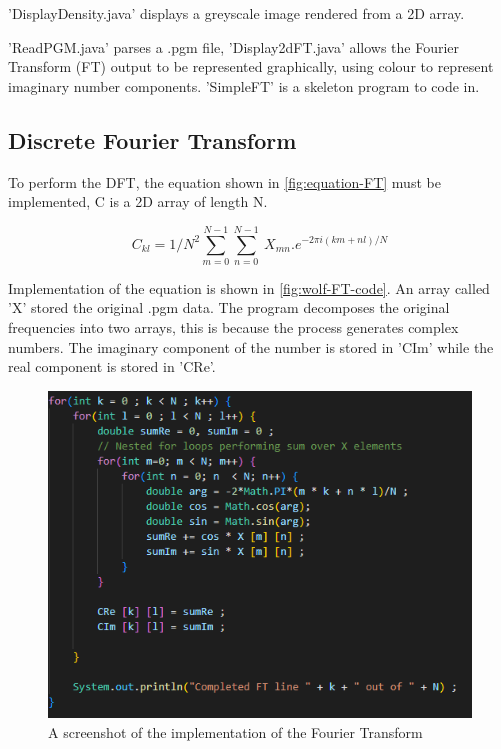     'DisplayDensity.java' displays a greyscale image rendered from a 2D array.
    
    'ReadPGM.java' parses a .pgm file, 'Display2dFT.java' allows the Fourier Transform (FT) output to be represented graphically, using colour to represent imaginary number components. 'SimpleFT' is a skeleton program to code in.
    

    
    \subsection{Discrete Fourier Transform}
    To perform the DFT, the equation shown in \autoref{fig:equation-FT} must be implemented, C is a 2D array of length N.
    
    \begin{center}
        \begin{equation}
            C_{kl} = 1/N^2 \sum_{m=0}^{N-1} \sum_{n=0}^{N-1}\ X_{mn} . e^{-2\pi i(km+nl)/N}
            \label{fig:equation-FT}
        \end{equation}  
    \end{center}%

    Implementation of the equation is shown in \autoref{fig:wolf-FT-code}. An array called 'X' stored the original .pgm data. The program decomposes the original frequencies into two arrays, this is because the process generates complex numbers. The imaginary component of the number is stored in 'CIm' while the real component is stored in 'CRe'. 
 
    \begin{figure}[H]
        \centering
        \includegraphics[width=1\columnwidth]{Figures/Week 1/W1-SimpleFT-Completed-For-Loop.png}
        \caption{A screenshot of the implementation of the Fourier Transform}
        \label{fig:wolf-FT-code}
    \end{figure}

